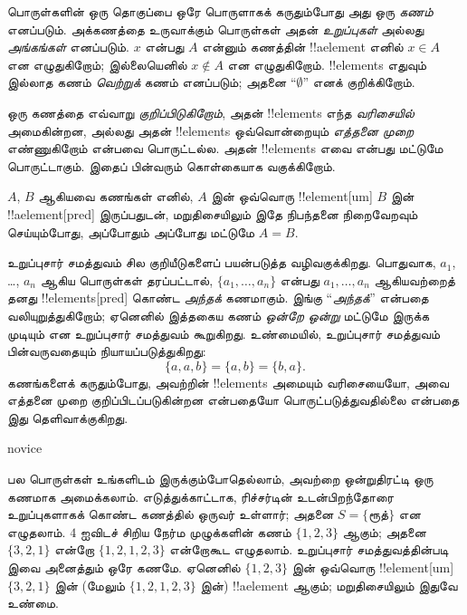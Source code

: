 \documentclass[../../../include/open-logic-section]{subfiles}
\begin{document}

பொருள்களின் ஒரு தொகுப்பை ஒரே பொருளாகக் கருதும்போது அது ஒரு \emph{கணம்}
எனப்படும். அக்கணத்தை உருவாக்கும் பொருள்கள் அதன் \emph{உறுப்புகள்} அல்லது
\emph{அங்கங்கள்} எனப்படும். $x$ என்பது $A$ என்னும் கணத்தின் !!a{element}
எனில் $x \in A$ என எழுதுகிறோம்; இல்லையெனில் $x \notin A$ என எழுதுகிறோம்.
!!{element}s எதுவும் இல்லாத கணம் \emph{வெற்றுக்} கணம் எனப்படும்;
அதனை ``$\emptyset$'' எனக் குறிக்கிறோம்.

\begin{explain}
ஒரு கணத்தை எவ்வாறு \emph{குறிப்பிடுகிறோம்}, அதன் !!{element}s எந்த
\emph{வரிசையில்} அமைகின்றன, அல்லது அதன் !!{element}s ஒவ்வொன்றையும்
\emph{எத்தனை முறை} எண்ணுகிறோம் என்பவை பொருட்டல்ல. அதன் !!{element}s
எவை என்பது மட்டுமே பொருட்டாகும். இதைப் பின்வரும் கொள்கையாக வகுக்கிறோம்.
\end{explain}

\begin{defn}[உறுப்புசார் சமத்துவம்]
  $A$, $B$ ஆகியவை கணங்கள் எனில், $A$ இன் ஒவ்வொரு !!{element}[um]
  $B$ இன் !!a{element}[pred] இருப்பதுடன், மறுதிசையிலும் இதே நிபந்தனை நிறைவேறவும்
  செய்யும்போது, அப்போதும் அப்போது மட்டுமே $A = B$.
\end{defn}

உறுப்புசார் சமத்துவம் சில குறியீடுகளைப் பயன்படுத்த வழிவகுக்கிறது.
பொதுவாக, $a_{1}$, \dots, $a_{n}$ ஆகிய பொருள்கள் தரப்பட்டால்,
$\{a_{1}, \dots, a_{n}\}$ என்பது $a_1, \ldots, a_n$ ஆகியவற்றைத் தனது
!!{element}s[pred] கொண்ட \emph{அந்தக்} கணமாகும். இங்கு ``\emph{அந்தக்}''
என்பதை வலியுறுத்துகிறோம்; ஏனெனில் இத்தகைய கணம் \emph{ஒன்றே ஒன்று}
மட்டுமே இருக்க முடியும் என உறுப்புசார் சமத்துவம் கூறுகிறது.
உண்மையில், உறுப்புசார் சமத்துவம் பின்வருவதையும் நியாயப்படுத்துகிறது:
  \[
    \{a, a, b\} = \{a, b\} = \{b,a\}.
  \]
கணங்களைக் கருதும்போது, அவற்றின் !!{element}s அமையும் வரிசையையோ,
அவை எத்தனை முறை குறிப்பிடப்படுகின்றன என்பதையோ பொருட்படுத்துவதில்லை
என்பதை இது தெளிவாக்குகிறது.

\begin{tagblock}{novice}
\begin{ex}
பல பொருள்கள் உங்களிடம் இருக்கும்போதெல்லாம், அவற்றை ஒன்றுதிரட்டி ஒரு
கணமாக அமைக்கலாம். எடுத்துக்காட்டாக, ரிச்சர்டின் உடன்பிறந்தோரை உறுப்புகளாகக்
கொண்ட கணத்தில் ஒருவர் உள்ளார்; அதனை $S=\{\textrm{ரூத்}\}$ என எழுதலாம்.
$4$ ஐவிடச் சிறிய நேர்ம முழுக்களின் கணம் $\{1, 2, 3\}$ ஆகும்;
அதனை $\{3, 2, 1\}$ என்றோ $\{1, 2, 1, 2, 3\}$ என்றோகூட எழுதலாம்.
உறுப்புசார் சமத்துவத்தின்படி இவை அனைத்தும் ஒரே கணமே.
ஏனெனில் $\{1, 2, 3\}$ இன் ஒவ்வொரு !!{element}[um]
$\{3, 2, 1\}$ இன் (மேலும் $\{1, 2, 1, 2, 3\}$ இன்) !!a{element}
ஆகும்; மறுதிசையிலும் இதுவே உண்மை.
\end{ex}
\end{tagblock}
\end{document}
